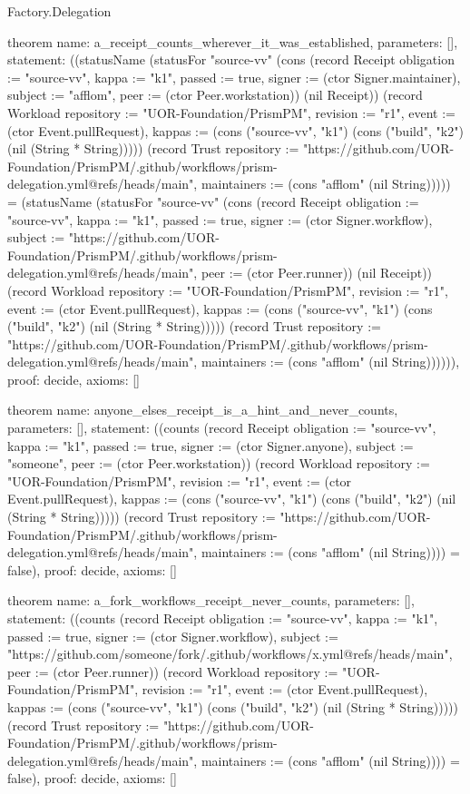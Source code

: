 \begin{lexlean}{Factory.Delegation}
\begin{semanticmodule}
theorem{
  name: a_receipt_counts_wherever_it_was_established,
  parameters: [],
  statement: ((statusName (statusFor "source-vv" (cons (record Receipt {obligation := "source-vv", kappa := "k1", passed := true, signer := (ctor Signer.maintainer), subject := "afflom", peer := (ctor Peer.workstation)}) (nil Receipt)) (record Workload {repository := "UOR-Foundation/PrismPM", revision := "r1", event := (ctor Event.pullRequest), kappas := (cons ("source-vv", "k1") (cons ("build", "k2") (nil (String * String))))}) (record Trust {repository := "https://github.com/UOR-Foundation/PrismPM/.github/workflows/prism-delegation.yml@refs/heads/main", maintainers := (cons "afflom" (nil String))}))) = (statusName (statusFor "source-vv" (cons (record Receipt {obligation := "source-vv", kappa := "k1", passed := true, signer := (ctor Signer.workflow), subject := "https://github.com/UOR-Foundation/PrismPM/.github/workflows/prism-delegation.yml@refs/heads/main", peer := (ctor Peer.runner)}) (nil Receipt)) (record Workload {repository := "UOR-Foundation/PrismPM", revision := "r1", event := (ctor Event.pullRequest), kappas := (cons ("source-vv", "k1") (cons ("build", "k2") (nil (String * String))))}) (record Trust {repository := "https://github.com/UOR-Foundation/PrismPM/.github/workflows/prism-delegation.yml@refs/heads/main", maintainers := (cons "afflom" (nil String))})))),
  proof: decide{},
  axioms: []
}

theorem{
  name: anyone_elses_receipt_is_a_hint_and_never_counts,
  parameters: [],
  statement: ((counts (record Receipt {obligation := "source-vv", kappa := "k1", passed := true, signer := (ctor Signer.anyone), subject := "someone", peer := (ctor Peer.workstation)}) (record Workload {repository := "UOR-Foundation/PrismPM", revision := "r1", event := (ctor Event.pullRequest), kappas := (cons ("source-vv", "k1") (cons ("build", "k2") (nil (String * String))))}) (record Trust {repository := "https://github.com/UOR-Foundation/PrismPM/.github/workflows/prism-delegation.yml@refs/heads/main", maintainers := (cons "afflom" (nil String))})) = false),
  proof: decide{},
  axioms: []
}

theorem{
  name: a_fork_workflows_receipt_never_counts,
  parameters: [],
  statement: ((counts (record Receipt {obligation := "source-vv", kappa := "k1", passed := true, signer := (ctor Signer.workflow), subject := "https://github.com/someone/fork/.github/workflows/x.yml@refs/heads/main", peer := (ctor Peer.runner)}) (record Workload {repository := "UOR-Foundation/PrismPM", revision := "r1", event := (ctor Event.pullRequest), kappas := (cons ("source-vv", "k1") (cons ("build", "k2") (nil (String * String))))}) (record Trust {repository := "https://github.com/UOR-Foundation/PrismPM/.github/workflows/prism-delegation.yml@refs/heads/main", maintainers := (cons "afflom" (nil String))})) = false),
  proof: decide{},
  axioms: []
}


\end{semanticmodule}
\end{lexlean}
